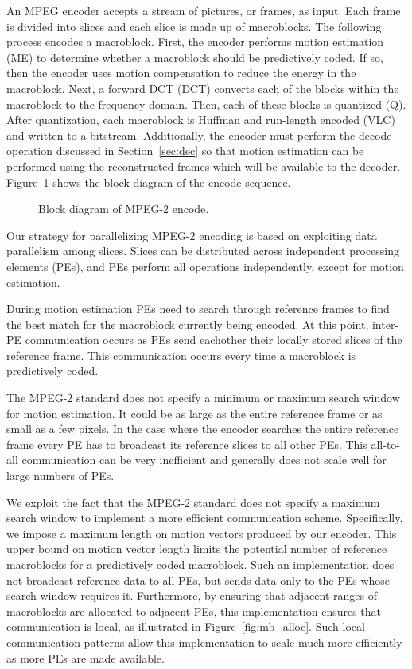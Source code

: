 
An MPEG encoder accepts a stream of pictures, or frames, as input.
Each frame is divided into slices and each slice is made up of
macroblocks.  The following process encodes a macroblock.  First, the
encoder performs motion estimation (ME) to determine whether a
macroblock should be predictively coded.  If so, then the encoder uses
motion compensation to reduce the energy in the macroblock.  Next, a
forward DCT (DCT) converts each of the blocks within the macroblock to
the frequency domain.  Then, each of these blocks is quantized (Q).
After quantization, each macroblock is Huffman and run-length encoded
(VLC) and written to a bitstream.  Additionally, the encoder must
perform the decode operation discussed in Section~\ref{sec:dec} so
that motion estimation can be performed using the reconstructed frames
which will be available to the decoder.  Figure~\ref{fig:ec_block}
shows the block diagram of the encode sequence.

\begin{figure}[htbp]
\centerline{ }
\caption{Block diagram of MPEG-2 encode.}
\label{fig:ec_block}
\end{figure}

Our strategy for parallelizing MPEG-2 encoding is based on exploiting
data parallelism among slices.  Slices can be distributed across
independent processing elements (PEs), and PEs perform all operations
independently, except for motion estimation.

During motion estimation PEs need to search through reference frames
to find the best match for the macroblock currently being encoded.  At
this point, inter-PE communication occurs as PEs send eachother their
locally stored slices of the reference frame.  This communication
occurs every time a macroblock is predictively coded.

The MPEG-2 standard does not specify a minimum or maximum search
window for motion estimation.  It could be as large as the entire
reference frame or as small as a few pixels.  In the case where the
encoder searches the entire reference frame every PE has to broadcast
its reference slices to all other PEs.  This all-to-all communication
can be very inefficient and generally does not scale well for large
numbers of PEs.

We exploit the fact that the MPEG-2 standard does not specify a
maximum search window to implement a more efficient communication
scheme. Specifically, we impose a maximum length on motion vectors
produced by our encoder.  This upper bound on motion vector length
limits the potential number of reference macroblocks for a
predictively coded macroblock.  Such an implementation does not
broadcast reference data to all PEs, but sends data only to the PEs
whose search window requires it.  Furthermore, by ensuring that
adjacent ranges of macroblocks are allocated to adjacent PEs, this
implementation ensures that communication is local, as illustrated in
Figure~\ref{fig:mb_alloc}.  Such local communication patterns allow
this implementation to scale much more efficiently as more PEs are
made available.

